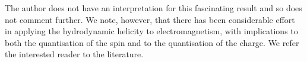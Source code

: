 The author does not have an interpretation for this fascinating result and so does not comment further.
We note, however, that there has been considerable effort in applying the hydrodynamic helicity to electromagnetism,
with implications to both the quantisation of the spin and to the quantisation of the charge.
We refer the interested reader to the literature\cite{Trueba1996, Trueba2000, Ranada2002}.








